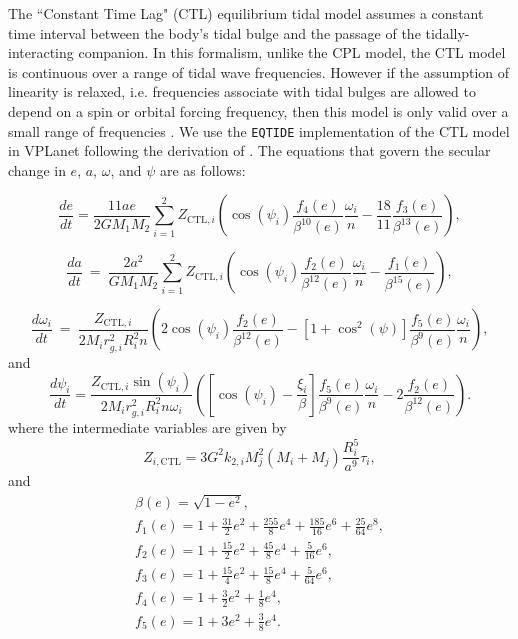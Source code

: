 \documentclass[twocolumn]{aastex61}
\newcommand{\eqtide}[0]{\texttt{EQTIDE}\xspace}
\begin{document}
The ``Constant Time Lag" (CTL) \citep[][]{Hut1981,Leconte2010} equilibrium tidal model assumes a constant time interval between the body's tidal bulge and the passage of the tidally-interacting companion. In this formalism, unlike the CPL model, the CTL model is continuous over a range of tidal wave frequencies.  However if the assumption of linearity is relaxed, i.e. frequencies associate with tidal bulges are allowed to depend on a spin or orbital forcing frequency, then this model is only valid over a small range of frequencies \citep{Greenberg2009}. We use the \eqtide implementation of the CTL model in VPLanet following the derivation of \citet{Leconte2010}.  The equations that govern the secular change in $e$, $a$, $\omega$, and $\psi$ are as follows:

\begin{equation} \label{eqn:ctl:e}
  \frac{de}{dt} = \frac{11 ae}{2 G M_1 M_2}
  \sum_{i = 1}^2 Z_{\mathrm{CTL},i} \left( \cos(\psi_i) \frac{f_4(e)}{\beta^{10}(e)}  \frac{\omega_i}{n} -\frac{18}{11} \frac{f_3(e)}{\beta^{13}(e)}\right),
\end{equation}

\begin{equation}\label{eqn:ctl:a}
  \frac{da}{dt} \ = \  \frac{2 a^2}{G M_1 M_2}
  \sum\limits_{i = 1}^2 Z_{\mathrm{CTL},i} \left( \cos(\psi_i) \frac{f_2(e)}{\beta^{12}(e)} \frac{\omega_i}{n} - \frac{f_1(e)}{\beta^{15}(e)}\right),
\end{equation}

\begin{equation}\label{eqn:ctl:omega}
  \frac{d\omega_i}{dt} \ = \ \frac{Z_{\mathrm{CTL},i}}{2 M_i r_{g,i}^2 
R_i^2 n} \left( 2 \cos(\psi_i) \frac{f_2(e)}{\beta^{12}(e)} - \left[ 1+\cos^2(\psi)
 \right] \frac{f_5(e)}{\beta^9(e)} 
\frac{\omega_i}{n} \right),  
\end{equation}
and
\begin{equation}\label{eqn:ctl:psi}
  \frac{d\psi_i}{dt} = \frac{Z_{\mathrm{CTL},i} \sin(\psi_i)}{2 M_i r_{g,i}^2 R_i^2 n \omega_i}\left( \left[ \cos(\psi_i) - \frac{\xi_i}{ \beta} \right] \frac{f_5(e)}{\beta^9(e)} \frac{\omega_i}{n} - 2 \frac{f_2(e)}{\beta^{12}(e)} \right).
\end{equation}
where the intermediate variables are given by 
\begin{equation}\label{eqn:ctl:z}
 Z_{i,\mathrm{CTL}} = 3 G^2 k_{2,i} M_j^2 (M_i+M_j) \frac{R_i^5}{a^9} \tau_i ,
\end{equation}
and 
\begin{equation}\label{eqn:ctl:f_e}
\begin{array}{l}
\beta(e) = \sqrt{1-e^2},\\
f_1(e) = 1 + \frac{31}{2} e^2 + \frac{255}{8} e^4 + \frac{185}{16} e^6 + \frac{25}{
64} e^8,\\
f_2(e) = 1 + \frac{15}{2} e^2 + \frac{45}{8} e^4 + \frac{5}{16} e^6,\\
f_3(e) = 1 + \frac{15}{4} e^2 + \frac{15}{8} e^4 + \frac{5}{64} e^6,\\
f_4(e) = 1 + \frac{3}{2} e^2 + \frac{1}{8} e^4,\\
f_5(e) = 1 + 3 e^2 + \frac{3}{8} e^4.
\end{array}
\end{equation}
\end{document}
